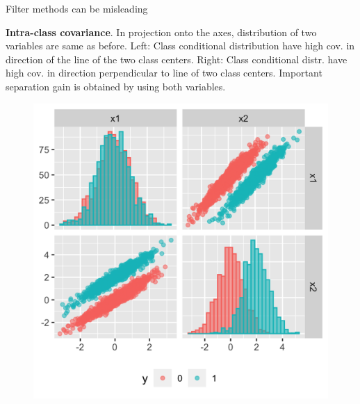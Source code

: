 \documentclass[11pt,compress,t,notes=noshow, xcolor=table]{beamer}
\begin{document}
\begin{vbframe}{Filter methods can be misleading}
\begin{figure}
\begin{minipage}{0.45\textwidth}
    \end{minipage}
    \end{figure}
\vspace{0.3cm}
\footnotesize{\textbf{Intra-class covariance}. In projection onto the axes, distribution of two variables are same as before. Left: Class conditional distribution have high cov. in direction of the line of the two class centers. Right: Class conditional distr. have high cov. in direction perpendicular to line of two class centers. Important separation gain is obtained by using both variables.}

 \framebreak
   

     \begin{figure}
    \centering
    \begin{minipage}{0.45\textwidth}
        \centering
        \includegraphics[width=\textwidth]{figure/guyon_example_correlation.png} %
    \end{minipage}\hfill
    \begin{minipage}{0.45\textwidth}
        \centering

\end{minipage}
\end{figure}
\end{vbframe}
\end{document}
